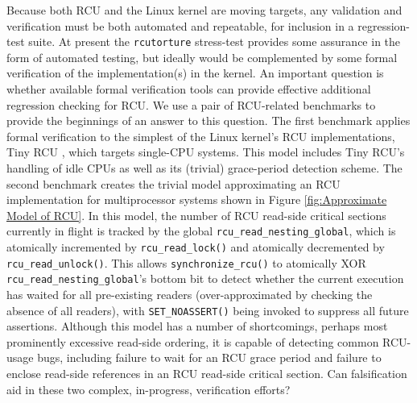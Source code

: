 \documentclass{svjour3}
\begin{document}
Because both RCU and the Linux kernel are moving targets, any validation
and verification must be both automated and repeatable, for inclusion
in a regression-test suite.  At present the {\tt rcutorture}
stress-test \cite{rcutorture} provides some assurance in the form of automated testing,
but ideally would be complemented by some formal verification of the
implementation(s) in the kernel.  An important question is whether
available formal verification tools can provide effective additional
regression checking for RCU.
We use a pair of RCU-related benchmarks \cite{PaulBlog1,PaulBlog2} to
provide the beginnings of an answer to this question.  The first
benchmark applies formal verification to the simplest of the Linux
kernel's RCU implementations, Tiny RCU
\cite{PaulEMcKenney2009BloatwatchRCU}, which targets single-CPU
systems.  This model includes Tiny RCU's handling of idle CPUs as well
as its (trivial) grace-period detection scheme.  The second benchmark
creates the trivial model approximating an RCU implementation for
multiprocessor systems shown in Figure \ref{fig:Approximate Model of
  RCU}.  In this model, the number of RCU read-side critical sections
currently in flight is tracked by the global
{\tt rcu\_read\_nesting\_global}, which is atomically incremented by
{\tt rcu\_read\_lock()} and atomically decremented by
{\tt rcu\_read\_unlock()}.  This allows {\tt synchronize\_rcu()} to
atomically XOR {\tt rcu\_read\_nesting\_global}'s bottom bit to detect
whether the current execution has waited for all pre-existing readers
(over-approximated by checking the absence of all readers), with
{\tt SET\_NOASSERT()} being invoked to suppress all future assertions.
Although this model has a number of shortcomings, perhaps most
prominently excessive read-side ordering, it is capable of detecting
common RCU-usage bugs, including failure to wait for an RCU grace
period and failure to enclose read-side references in an RCU read-side
critical section.  Can falsification aid in these two complex,
in-progress, verification efforts?
\end{document}
